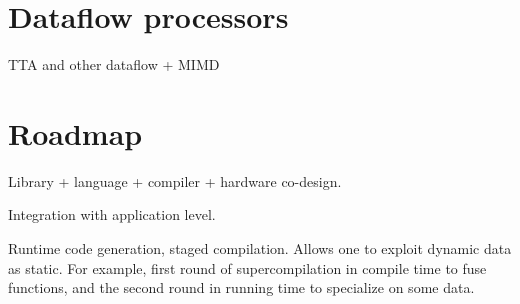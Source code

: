 \documentclass[10pt,conference]{IEEEtran}
\begin{document}
\section{Dataflow processors}

TTA and other dataflow + MIMD

\section{Roadmap}

Library + language + compiler + hardware co-design.

Integration with application level.

Runtime code generation, staged compilation. 
Allows one to exploit dynamic data as static. 
For example, first round of supercompilation in compile time to fuse functions, and the second round in running time to specialize on some data. 






\end{document}
